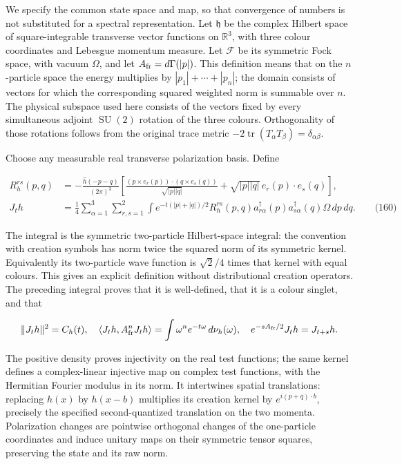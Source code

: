 We specify the common state space and map, so that convergence of
numbers is not substituted for a spectral representation. Let
\(\mathfrak h\) be the complex Hilbert space of square-integrable
transverse vector functions on \(\mathbb R^3\), with three colour
coordinates and Lebesgue momentum measure. Let \(\mathcal F\) be its
symmetric Fock space, with vacuum \(\Omega\), and let
\(A_{\rm fr}=d\Gamma(|p|)\). This definition means that on the
\(n\)-particle space the energy multiplies by \(|p_1|+\cdots+|p_n|\);
the domain consists of vectors for which the corresponding squared
weighted norm is summable over \(n\). The physical subspace used here
consists of the vectors fixed by every simultaneous adjoint
\(\operatorname{SU}(2)\) rotation of the three colours. Orthogonality of
those rotations follows from the original trace metric
\(-2\operatorname{tr}(T_\alpha T_\beta)=\delta_{\alpha\beta}\).

Choose any measurable real transverse polarization basis. Define

\[
\begin{aligned}
 R_h^{rs}(p,q)&=-\frac{\widehat h(-p-q)}{(2\pi)^3}
 \left[\frac{(p\times e_r(p))\cdot(q\times e_s(q))}{\sqrt{|p||q|}}
       +\sqrt{|p||q|}\,e_r(p)\cdot e_s(q)\right],\\
 J_t h&=\frac14\sum_{\alpha=1}^3\sum_{r,s=1}^2
 \int e^{-t(|p|+|q|)/2}R_h^{rs}(p,q)
    a^\dagger_{r\alpha}(p)a^\dagger_{s\alpha}(q)\Omega\,dp\,dq.
 \qquad\text{(160)}
\end{aligned}
\]

The integral is the symmetric two-particle Hilbert-space integral: the
convention with creation symbols has norm twice the squared norm of its
symmetric kernel. Equivalently its two-particle wave function is
\(\sqrt2/4\) times that kernel with equal colours. This gives an
explicit definition without distributional creation operators. The
preceding integral proves that it is well-defined, that it is a colour
singlet, and that

\[
\|J_t h\|^2=C_h(t),\quad
 \langle J_t h,A_{\rm fr}^nJ_t h\rangle
       =\int\omega^n e^{-t\omega}\,d\nu_h(\omega),\quad
 e^{-sA_{\rm fr}/2}J_t h=J_{t+s}h.
\]

The positive density proves injectivity on the real test functions; the
same kernel defines a complex-linear injective map on complex test
functions, with the Hermitian Fourier modulus in its norm. It
intertwines spatial translations: replacing \(h(x)\) by \(h(x-b)\)
multiplies its creation kernel by \(e^{i(p+q)\cdot b}\), precisely the
specified second-quantized translation on the two momenta. Polarization
changes are pointwise orthogonal changes of the one-particle coordinates
and induce unitary maps on their symmetric tensor squares, preserving
the state and its raw norm.

